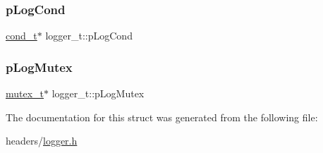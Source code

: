\subsubsection{\texorpdfstring{p\+Log\+Cond}{pLogCond}}
{\footnotesize\ttfamily \hyperlink{datatypes_8h_ab9991f7052428330da4c2fb771e0439f}{cond\+\_\+t}$\ast$ logger\+\_\+t\+::p\+Log\+Cond}

\mbox{\label{structlogger__t_ac1af7dd39e882cfeaffb4b77e2fa4fd7}} 
\subsubsection{\texorpdfstring{p\+Log\+Mutex}{pLogMutex}}
{\footnotesize\ttfamily \hyperlink{datatypes_8h_a6bfdd7a014fe4d4d6c392df201d822dd}{mutex\+\_\+t}$\ast$ logger\+\_\+t\+::p\+Log\+Mutex}



The documentation for this struct was generated from the following file\+:\begin{DoxyCompactItemize}
\item 
headers/\hyperlink{logger_8h}{logger.\+h}\end{DoxyCompactItemize}
